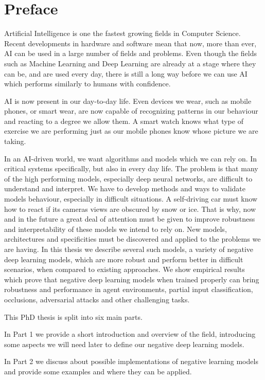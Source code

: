 \documentclass[b5paper]{book}
\begin{document}
\chapter{Preface}

Artificial Intelligence is one the fastest growing fields in Computer Science. Recent developments in hardware and software mean that now, more than ever, AI can be used in a large number of fields and problems. Even though the fields such as Machine Learning and Deep Learning are already at a stage where they can be, and are used every day, there is still a long way before we can use AI which performs similarly to humans with confidence. 

AI is now present in our day-to-day life. Even devices we wear, such as mobile phones, or smart wear, are now capable of recognizing patterns in our behaviour and reacting to a degree we allow them. A smart watch knows what type of exercise we are performing just as our mobile phones know whose picture we are taking. 

In an AI-driven world, we want algorithms and models which we can rely on. In critical systems specifically, but also in every day life. The problem is that many of the high performing models, especially deep neural networks, are difficult to understand and interpret. We have to develop methods and ways to validate models behaviour, especially in difficult situations. A self-driving car must know how to react if its cameras views are obscured by snow or ice. That is why, now and in the future a great deal of attention must be given to improve robustness and interpretability of these models we intend to rely on. New models, architectures and specificities must be discovered and applied to the problems we are having. In this thesis we describe several such models, a variety of negative deep learning models, which are more robust and perform better in difficult scenarios, when compared to existing approaches. We show empirical results which prove that negative deep learning models when trained properly can bring robustness and performance in agent environments, partial input classification, occlusions, adversarial attacks and other challenging tasks.

This PhD thesis is split into six main parts.

In Part 1 we provide a short introduction and overview of the field, introducing some aspects we will need later to define our negative deep learning models.

In Part 2 we discuss about possible implementations of negative learning models and provide some examples and where they can be applied.
\end{document}
